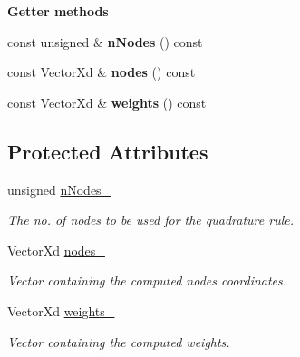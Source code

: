 \begin{Indent}{\bf Getter methods}\par
\begin{DoxyCompactItemize}
\item 
\hypertarget{classQuadratureRule_a1fe4b7cc4dd74cd606cd56e169b20895}{const unsigned \& {\bfseries n\-Nodes} () const }\label{classQuadratureRule_a1fe4b7cc4dd74cd606cd56e169b20895}

\item 
\hypertarget{classQuadratureRule_a3e83db6b0a26aa35fa94d592c2c5426c}{const Vector\-Xd \& {\bfseries nodes} () const }\label{classQuadratureRule_a3e83db6b0a26aa35fa94d592c2c5426c}

\item 
\hypertarget{classQuadratureRule_ad03df86d720dadce277cd07fe460d8ee}{const Vector\-Xd \& {\bfseries weights} () const }\label{classQuadratureRule_ad03df86d720dadce277cd07fe460d8ee}

\end{DoxyCompactItemize}
\end{Indent}
\subsection*{Protected Attributes}
\begin{DoxyCompactItemize}
\item 
\hypertarget{classQuadratureRule_a8f4bb43717322579edc12974700aec98}{unsigned \hyperlink{classQuadratureRule_a8f4bb43717322579edc12974700aec98}{n\-Nodes\-\_\-}}\label{classQuadratureRule_a8f4bb43717322579edc12974700aec98}

\begin{DoxyCompactList}\small\item\em The no. of nodes to be used for the quadrature rule. \end{DoxyCompactList}\item 
\hypertarget{classQuadratureRule_a62ad07fa140bcc39af00e04b045dd341}{Vector\-Xd \hyperlink{classQuadratureRule_a62ad07fa140bcc39af00e04b045dd341}{nodes\-\_\-}}\label{classQuadratureRule_a62ad07fa140bcc39af00e04b045dd341}

\begin{DoxyCompactList}\small\item\em Vector containing the computed nodes coordinates. \end{DoxyCompactList}\item 
\hypertarget{classQuadratureRule_a092f514241565ee4a925e654b331dbf6}{Vector\-Xd \hyperlink{classQuadratureRule_a092f514241565ee4a925e654b331dbf6}{weights\-\_\-}}\label{classQuadratureRule_a092f514241565ee4a925e654b331dbf6}

\begin{DoxyCompactList}\small\item\em Vector containing the computed weights. \end{DoxyCompactList}\end{DoxyCompactItemize}
